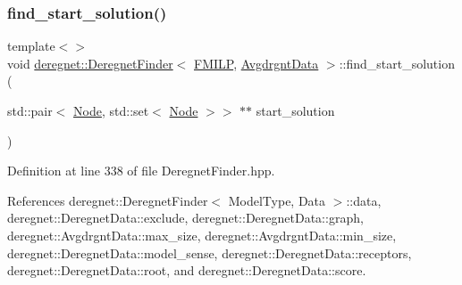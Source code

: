 \subsubsection{\texorpdfstring{find\+\_\+start\+\_\+solution()}{find\_start\_solution()}\hspace{0.1cm}{\footnotesize\ttfamily [3/3]}}
{\footnotesize\ttfamily template$<$$>$ \\
void \hyperlink{classderegnet_1_1DeregnetFinder}{deregnet\+::\+Deregnet\+Finder}$<$ \hyperlink{namespacederegnet_a31759ad43b8b9641205bcf69b09f10c5}{F\+M\+I\+LP}, \hyperlink{classderegnet_1_1AvgdrgntData}{Avgdrgnt\+Data} $>$\+::find\+\_\+start\+\_\+solution (\begin{DoxyParamCaption}\item[{std\+::pair$<$ \hyperlink{namespacederegnet_a744bad34f2de9856d36715a445f027f3}{Node}, std\+::set$<$ \hyperlink{namespacederegnet_a744bad34f2de9856d36715a445f027f3}{Node} $>$$>$ $\ast$$\ast$}]{start\+\_\+solution }\end{DoxyParamCaption})\hspace{0.3cm}{\ttfamily [inline]}}



Definition at line 338 of file Deregnet\+Finder.\+hpp.



References deregnet\+::\+Deregnet\+Finder$<$ Model\+Type, Data $>$\+::data, deregnet\+::\+Deregnet\+Data\+::exclude, deregnet\+::\+Deregnet\+Data\+::graph, deregnet\+::\+Avgdrgnt\+Data\+::max\+\_\+size, deregnet\+::\+Avgdrgnt\+Data\+::min\+\_\+size, deregnet\+::\+Deregnet\+Data\+::model\+\_\+sense, deregnet\+::\+Deregnet\+Data\+::receptors, deregnet\+::\+Deregnet\+Data\+::root, and deregnet\+::\+Deregnet\+Data\+::score.


